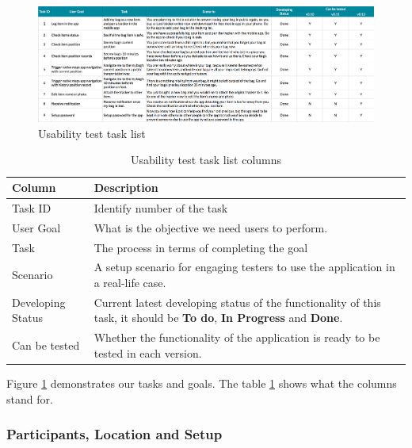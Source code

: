 \documentclass[12pt,a4paper]{article}
\begin{document}
            \begin{figure}[H]
              \centering
              \includegraphics[width=1\textwidth]{../assets/usability-test-task-list.png}
              \caption{Usability test task list}
              \label{fig:Usability test task list}
            \end{figure}

            \begin{table}[H]
              \centering
                \begin{tabularx}{\textwidth}{l X}
                  \hline
                  Column & Description  \\ \hline
                  Task ID & Identify number of the task  \\ 
                  User Goal & What is the objective we need users to perform.  \\ 
                  Task & The process in terms of completing the goal  \\ 
                  Scenario & A setup scenario for engaging testers to use the application in a real-life case.   \\ 
                  Developing Status & Current latest developing status of the functionality of this task, it should be {\bf To do}, {\bf In Progress} and {\bf Done}.\\ 
                  Can be tested &  Whether the functionality of the application is ready to be tested in each version.\\ 
                  \hline
                \end{tabularx}
                \caption[Table caption text]{Usability test task list columns}
                \label{table:Usability test task list columns}
            \end{table}

            Figure \ref{fig:Usability test task list} demonstrates our tasks and goals. The table \ref{table:Usability test task list columns} shows what the columns stand for.

        \subsubsection{Participants, Location and Setup}
\end{document}
